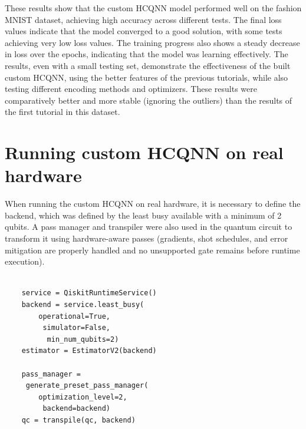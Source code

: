\documentclass[conference]{IEEEtran}
\begin{document}
\begin{table}[ht]
\centering
{}
\caption{accuracy and final loss of the tests}
\end{table}



\noindent
These results show that the custom HCQNN model performed well on the fashion MNIST dataset, achieving high accuracy across different tests. The final loss values indicate that the model converged to a good solution, with some tests achieving very low loss values. The training progress also shows a steady decrease in loss over the epochs, indicating that the model was learning effectively.
The results, even with a small testing set, demonstrate the effectiveness of the built custom HCQNN, using the better features of the previous tutorials, while also testing different encoding methods and optimizers. These results were comparatively better and more stable (ignoring the outliers) than the results of the first tutorial in this dataset.

\section*{\fontsize{16}{20}\selectfont Running custom HCQNN on real hardware}

\noindent
When running the custom HCQNN on real hardware, it is necessary to define the backend, which was defined by the least busy available with a minimum of 2 qubits. A pass manager and transpiler were also used in the quantum circuit to transform it using hardware-aware passes (gradients, shot schedules, and error mitigation are properly handled and no unsupported gate remains before runtime execution).

{
\small
\begin{verbatim}
    
    service = QiskitRuntimeService()
    backend = service.least_busy(
        operational=True,
         simulator=False,
          min_num_qubits=2)
    estimator = EstimatorV2(backend)

    pass_manager =
     generate_preset_pass_manager(
        optimization_level=2,
         backend=backend)
    qc = transpile(qc, backend)

\end{verbatim}}
\end{document}

